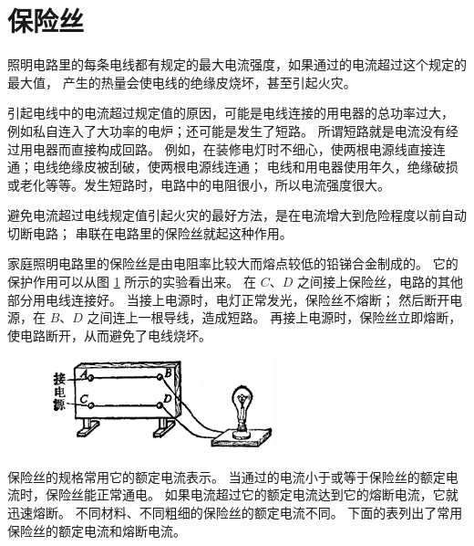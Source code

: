 \section{保险丝}\label{sec:11-3}

照明电路里的每条电线都有规定的最大电流强度，如果通过的电流超过这个规定的最大值，
产生的热量会使电线的绝缘皮烧坏，甚至引起火灾。

引起电线中的电流超过规定值的原因，可能是电线连接的用电器的总功率过大，
例如私自连入了大功率的电炉；还可能是发生了短路。
所谓短路就是电流没有经过用电器而直接构成回路。
例如，在装修电灯时不细心，使两根电源线直接连通；电线绝缘皮被刮破，使两根电源线连通；
电线和用电器使用年久，绝缘破损或老化等等。发生短路时，电路中的电阻很小，所以电流强度很大。

避免电流超过电线规定值引起火灾的最好方法，是在电流增大到危险程度以前自动切断电路；
串联在电路里的保险丝就起这种作用。

家庭照明电路里的保险丝是由电阻率比较大而熔点较低的铅锑合金制成的。
它的保护作用可以从图 \ref{fig:11-5} 所示的实验看出来。
在 $C$、$D$ 之间接上保险丝，电路的其他部分用电线连接好。
当接上电源时，电灯正常发光，保险丝不熔断；
然后断开电源，在 $B$、$D$ 之间连上一根导线，造成短路。
再接上电源时，保险丝立即熔断，使电路断开，从而避免了电线烧坏。

\begin{figure}[htbp]
    \centering
    \includegraphics[width=0.6\textwidth]{../pic/czwl2-ch11-5}
    \caption{}\label{fig:11-5}
\end{figure}

保险丝的规格常用它的额定电流表示。
当通过的电流小于或等于保险丝的额定电流时，保险丝能正常通电。
如果电流超过它的额定电流达到它的熔断电流，它就迅速熔断。
不同材料、不同粗细的保险丝的额定电流不同。
下面的表列出了常用保险丝的额定电流和熔断电流。

